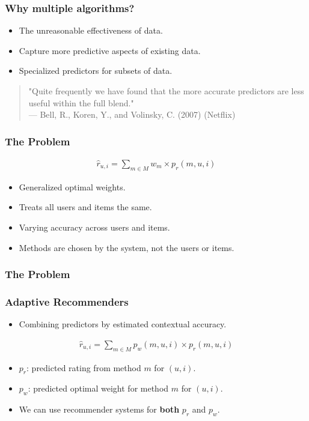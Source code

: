 \documentclass[screen]{beamer}
\begin{document}
\begin{frame}
  \frametitle{Why multiple algorithms?}
  \begin{itemize}
    \item The unreasonable effectiveness of data.
    \item Capture more predictive aspects of existing data.
    \item Specialized predictors for subsets of data.
  \end{itemize}
  \vspace{2em}
  \begin{quote}
    "Quite frequently we have found that the more accurate predictors are less useful within the full blend."\\
    --- Bell, R., Koren, Y., and Volinsky, C. (2007) (Netflix)
  \end{quote}  
\end{frame}

\begin{frame}
  \frametitle{The Problem}
  \begin{eqnarray}
    \hat{r}_{u,i} = \sum_{m \in M} w_{m} \times p_{r}(m,u,i)
  \end{eqnarray}
  \begin{itemize}
    \item Generalized optimal weights.
    \item Treats all users and items the same.
    \item Varying accuracy across users and items.
    \item Methods are chosen by the system, not the users or items.
  \end{itemize}
\end{frame}

\begin{frame}
  \frametitle{The Problem}
  \huge
\end{frame}

\begin{frame}
  \frametitle{Adaptive Recommenders}
  \begin{itemize}
    \item Combining predictors by estimated contextual accuracy.
  \end{itemize}
  \begin{eqnarray}
    \hat{r}_{u,i} = \sum_{m \in M} p_{w}(m,u,i) \times p_{r}(m,u,i)
  \end{eqnarray}
  \begin{itemize}
    \item $p_r$: predicted rating from method $m$ for $(u,i)$.
    \item $p_w$: predicted optimal weight for method $m$ for $(u,i)$.
    \item We can use recommender systems for \textbf{both} $p_r$ and $p_w$.
  \end{itemize}
\end{frame}
\end{document}
